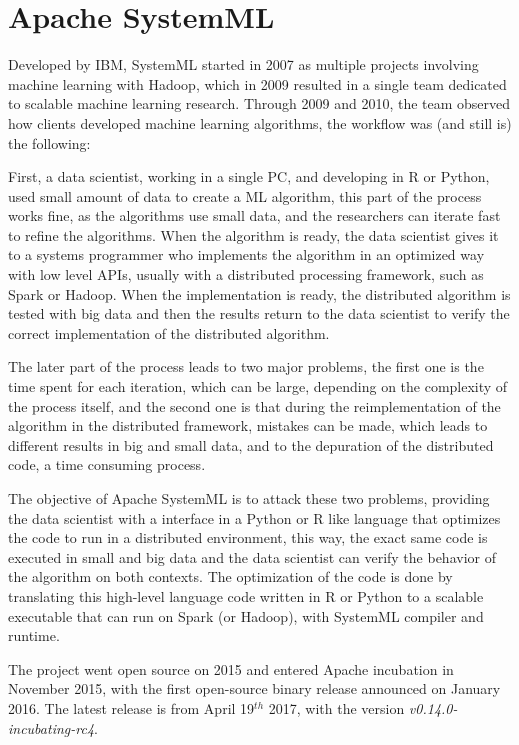 \documentclass[11pt]{book} %
\begin{document}
\newpage

  \section{Apache SystemML}

    Developed by IBM, SystemML started in 2007 as multiple projects involving machine learning with Hadoop, which in 2009 resulted in a single team dedicated to scalable machine learning research. Through 2009 and 2010, the team observed how clients developed machine learning algorithms, the workflow was (and still is) the following:

    First, a data scientist, working in a single PC, and developing in R or Python, used small amount of data to create a ML algorithm, this part of the process works fine, as the algorithms use small data, and the researchers can iterate fast to refine the algorithms. When the algorithm is ready, the data scientist gives it to a systems programmer who implements the algorithm in an optimized way with low level APIs, usually with a distributed processing framework, such as Spark or Hadoop. When the implementation is ready, the distributed algorithm is tested with big data and then the results return to the data scientist to verify the correct implementation of the distributed algorithm.

    The later part of the process leads to two major problems, the first one is the time spent for each iteration, which can be large, depending on the complexity of the process itself, and the second one is that during the reimplementation of the algorithm in the distributed framework, mistakes can be made, which leads to different results in big and small data, and to the depuration of the distributed code, a time consuming process.

    The objective of Apache SystemML is to attack these two problems, providing the data scientist with a interface in a Python or R like language that optimizes the code to run in a distributed environment, this way, the exact same code is executed in small and big data and the data scientist can verify the behavior of the algorithm on both contexts. The optimization of the code is done by translating this high-level language code written in R or Python to a scalable executable that can run on Spark (or Hadoop), with SystemML compiler and runtime.

    The project went open source on 2015 and entered Apache incubation in November 2015, with the first open-source binary release announced on January 2016. The latest release is from April 19$^{th}$ 2017, with the version \emph{v0.14.0-incubating-rc4}.
\end{document}
